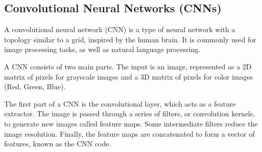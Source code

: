 



\subsection{Convolutional Neural Networks (CNNs)}
\label{sec:cnn}
A convolutional neural network (CNN) is a type of neural network with a topology similar to a grid, inspired by the human brain. It is commonly used for image processing tasks, as well as natural language processing.

A CNN consists of two main parts. The input is an image, represented as a 2D matrix of pixels for grayscale images and a 3D matrix of pixels for color images (Red, Green, Blue).

The first part of a CNN is the convolutional layer, which acts as a feature extractor. The image is passed through a series of filters, or convolution kernels, to generate new images called feature maps. Some intermediate filters reduce the image resolution. Finally, the feature maps are concatenated to form a vector of features, known as the CNN code.

